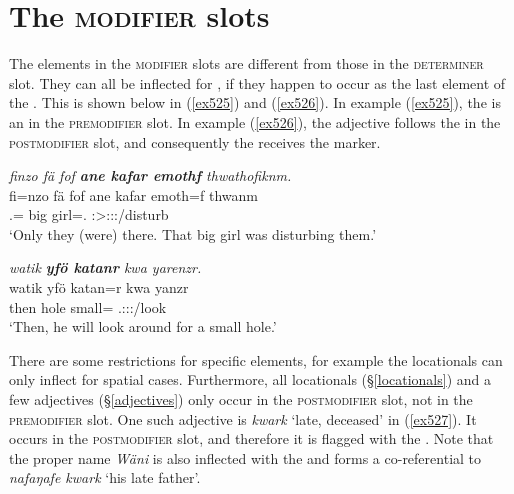 \section{The \textsc{modifier} slots}\label{npsyntaxmodifier}

The elements in the \textsc{modifier} slots are different from those in the \textsc{determiner} slot. They can all be inflected for , if they happen to occur as the last element of the . This is shown below in (\ref{ex525}) and (\ref{ex526}). In example (\ref{ex525}), the  is an  in the \textsc{premodifier} slot. In example (\ref{ex526}), the adjective follows the  in the \textsc{postmodifier} slot, and consequently the  receives the  marker.

\begin{exe}
	\ex \emph{finzo fä fof \textbf{ane kafar emothf} thwathofiknm.}\\
	\gll fi=nzo fä fof ane kafar emoth=f thwanm\\
	\Third.\Abs=\Only{} \Dist{} \Emph{} \Dem{} big girl=\Erg.\Sg{} \Sg:\Sbj>\Stdu:\Obj:\Pst:\Dur/disturb\\
	\trans `Only they (were) there. That big girl was disturbing them.'\\
	\label{ex525}
\end{exe}
\begin{exe}
	\ex \emph{watik \textbf{yfö katanr} kwa yarenzr.}\\
	\gll watik yfö katan=r kwa yanzr\\
	then hole small=\Purp{} \Fut{} \Tsg.\Masc:\Sbj:\Nonpast:\Ipfv/look\\
	\trans `Then, he will look around for a small hole.'
	\label{ex526}
\end{exe}

There are some restrictions for specific elements, for example the locationals can only inflect for spatial cases. Furthermore, all locationals (\S{}\ref{locationals}) and a few adjectives (\S{}\ref{adjectives}) only occur in the \textsc{postmodifier} slot, not in the \textsc{premodifier} slot. One such adjective is \emph{kwark} `late, deceased' in (\ref{ex527}). It occurs in the \textsc{postmodifier} slot, and therefore it is flagged with the  . Note that the proper name \emph{Wäni} is also inflected with the  and forms a  co-referential to \emph{nafaŋafe kwark} `his late father'.

